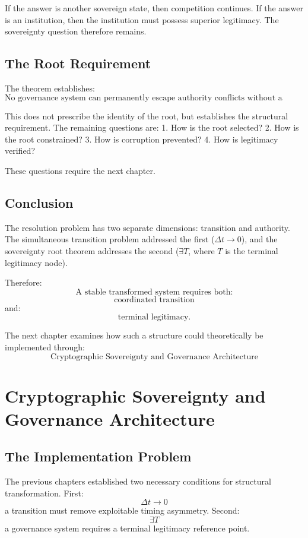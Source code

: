 \documentclass[11pt,openany]{book}
\theoremstyle{plain}
\theoremstyle{definition}
\begin{document}
If the answer is another sovereign state, then competition continues. If the answer is an institution, then the institution must possess superior legitimacy. The sovereignty question therefore remains.

\section*{The Root Requirement}

The theorem establishes:
\[
\boxed{
\text{No governance system can permanently escape authority conflicts without a terminal legitimacy structure.}
}
\]

This does not prescribe the identity of the root, but establishes the structural requirement. The remaining questions are:
1. How is the root selected?
2. How is the root constrained?
3. How is corruption prevented?
4. How is legitimacy verified?

These questions require the next chapter.

\section*{Conclusion}

The resolution problem has two separate dimensions: transition and authority. The simultaneous transition problem addressed the first (\(\Delta t \to 0\)), and the sovereignty root theorem addresses the second (\(\exists T\), where \(T\) is the terminal legitimacy node).

Therefore:
\[
\boxed{
\text{A stable transformed system requires both:}
}
\]
\[
\boxed{
\text{coordinated transition}
}
\]
and:
\[
\boxed{
\text{terminal legitimacy.}
}
\]

The next chapter examines how such a structure could theoretically be implemented through:
\[
\boxed{
\text{Cryptographic Sovereignty and Governance Architecture}
}
\]

\chapter{Cryptographic Sovereignty and Governance Architecture}

\section*{The Implementation Problem}

The previous chapters established two necessary conditions for structural transformation. First:
\[
\Delta t \to 0
\]
a transition must remove exploitable timing asymmetry. Second:
\[
\exists T
\]
a governance system requires a terminal legitimacy reference point.
\end{document}
